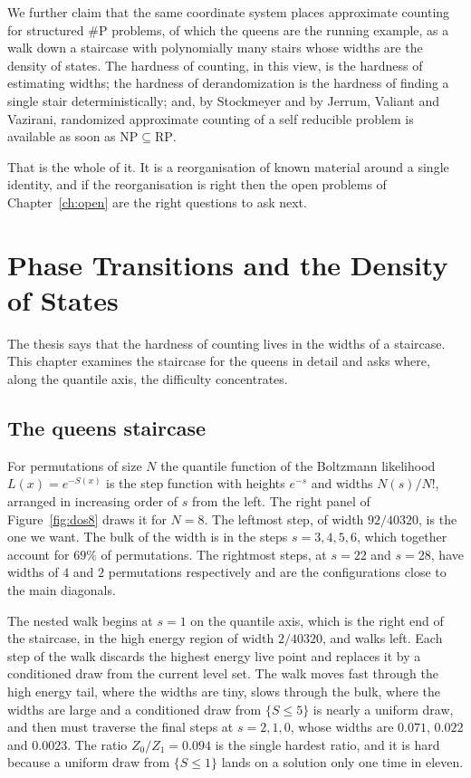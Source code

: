 \documentclass[11pt,twoside,openany]{book}
\theoremstyle{plain}
\theoremstyle{definition}
\theoremstyle{remark}
\newcommand{\RP}{\mathrm{RP}}
\newcommand{\NP}{\mathrm{NP}}
\newcommand{\sharpP}{\#\mathrm{P}}
\begin{document}
We further claim that the same coordinate system places approximate counting for structured $\sharpP$ problems, of which the queens are the running example, as a walk down a staircase with polynomially many stairs whose widths are the density of states. The hardness of counting, in this view, is the hardness of estimating widths; the hardness of derandomization is the hardness of finding a single stair deterministically; and, by Stockmeyer and by Jerrum, Valiant and Vazirani, randomized approximate counting of a self reducible problem is available as soon as $\NP \subseteq \RP$.

That is the whole of it. It is a reorganisation of known material around a single identity, and if the reorganisation is right then the open problems of Chapter~\ref{ch:open} are the right questions to ask next.



\chapter{Phase Transitions and the Density of States}
\label{ch:phase}

The thesis says that the hardness of counting lives in the widths of a staircase. This chapter examines the staircase for the queens in detail and asks where, along the quantile axis, the difficulty concentrates.

\section{The queens staircase}

For permutations of size $N$ the quantile function of the Boltzmann likelihood $L(x) = e^{-S(x)}$ is the step function with heights $e^{-s}$ and widths $N(s) / N!$, arranged in increasing order of $s$ from the left. The right panel of Figure~\ref{fig:dos8} draws it for $N = 8$. The leftmost step, of width $92 / 40320$, is the one we want. The bulk of the width is in the steps $s = 3, 4, 5, 6$, which together account for $69\%$ of permutations. The rightmost steps, at $s = 22$ and $s = 28$, have widths of $4$ and $2$ permutations respectively and are the configurations close to the main diagonals.

The nested walk begins at $s = 1$ on the quantile axis, which is the right end of the staircase, in the high energy region of width $2 / 40320$, and walks left. Each step of the walk discards the highest energy live point and replaces it by a conditioned draw from the current level set. The walk moves fast through the high energy tail, where the widths are tiny, slows through the bulk, where the widths are large and a conditioned draw from $\{ S \le 5 \}$ is nearly a uniform draw, and then must traverse the final steps at $s = 2, 1, 0$, whose widths are $0.071$, $0.022$ and $0.0023$. The ratio $Z_0 / Z_1 = 0.094$ is the single hardest ratio, and it is hard because a uniform draw from $\{ S \le 1 \}$ lands on a solution only one time in eleven.
\end{document}
